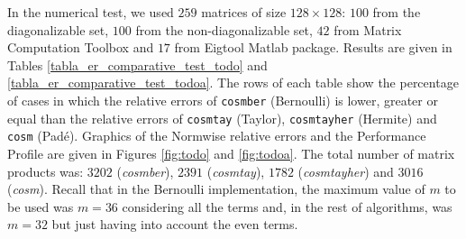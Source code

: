 In the numerical test, we used $259$ matrices of size $128\times 128$: $100$ from the diagonalizable set, $100$ from the non-diagonalizable set, $42$ from Matrix Computation Toolbox and $17$ from Eigtool Matlab package. Results are given in Tables \ref{tabla_er_comparative_test_todo} and \ref{tabla_er_comparative_test_todoa}. The rows of each table show the percentage of cases in which the relative errors of \texttt{cosmber} (Bernoulli) is lower, greater or equal than the relative errors of \texttt{cosmtay} (Taylor), \texttt{cosmtayher} (Hermite)  and  \texttt{cosm} (Pad\'e). Graphics of the Normwise relative errors and the Performance Profile are given in Figures \ref{fig:todo} and \ref{fig:todoa}. The total number of matrix products was: $3202$ (\emph{cosmber}), $2391$ (\emph{cosmtay}), $1782$ (\emph{cosmtayher}) and  $3016$ (\emph{cosm}). Recall that in the Bernoulli implementation, the maximum value of $m$ to be used was $m=36$ considering all the terms and, in the rest of algorithms, was $m=32$ but just having into account the even terms.


